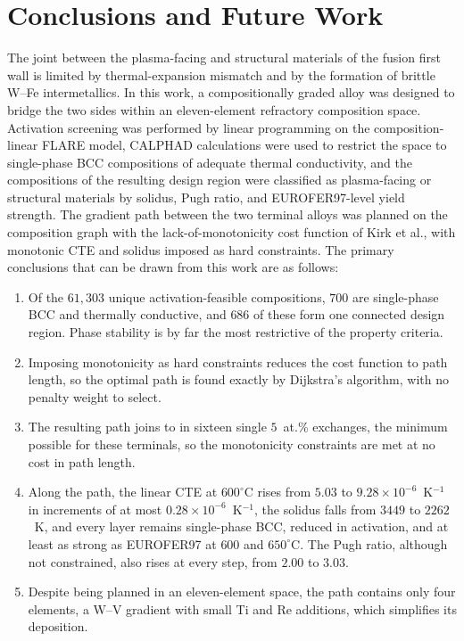 \section{Conclusions and Future Work}
\label{sec:conclusion}

The joint between the plasma-facing and structural materials of the fusion first wall
is limited by thermal-expansion mismatch and by the formation of brittle W--Fe
intermetallics. In this work, a compositionally graded alloy was designed to bridge
the two sides within an eleven-element refractory composition space. Activation
screening was performed by linear programming on the composition-linear FLARE model,
CALPHAD calculations were used to restrict the space to single-phase BCC compositions
of adequate thermal conductivity, and the compositions of the resulting design region
were classified as plasma-facing or structural materials by solidus, Pugh ratio, and
EUROFER97-level yield strength. The gradient path between the two terminal alloys was
planned on the composition graph with the lack-of-monotonicity cost function of Kirk
et al., with monotonic CTE and solidus imposed as hard constraints. The primary
conclusions that can be drawn from this work are as follows:

\begin{enumerate}
\item Of the \(61{,}303\) unique activation-feasible compositions, \(700\) are
single-phase BCC and thermally conductive, and \(686\) of these form one connected
design region. Phase stability is by far the most restrictive of the property
criteria.
\item Imposing monotonicity as hard constraints reduces the cost function to path
length, so the optimal path is found exactly by Dijkstra's algorithm, with no
penalty weight to select.
\item The resulting path joins  to  in sixteen single
\(5\)~at.\% exchanges, the minimum possible for these terminals, so the monotonicity
constraints are met at no cost in path length.
\item Along the path, the linear CTE at \(600^{\circ}\)C rises from \(5.03\) to
\(9.28\times10^{-6}\)~K\(^{-1}\) in increments of at most
\(0.28\times10^{-6}\)~K\(^{-1}\), the solidus falls from \(3449\) to \(2262\)~K, and
every layer remains single-phase BCC, reduced in activation, and at least as strong as
EUROFER97 at \(600\) and \(650^{\circ}\)C. The Pugh ratio, although not constrained,
also rises at every step, from \(2.00\) to \(3.03\).
\item Despite being planned in an eleven-element space, the path contains only four
elements, a W--V gradient with small Ti and Re additions, which simplifies its
deposition.
\end{enumerate}


